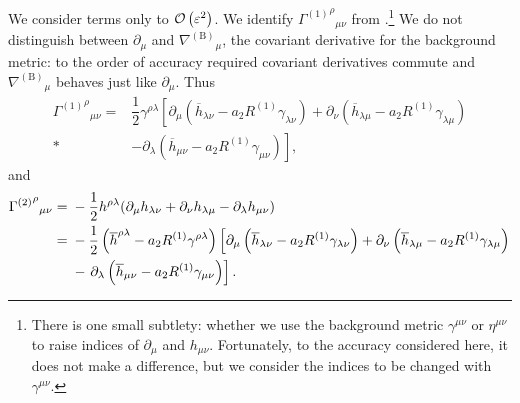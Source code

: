We consider terms only to $\mathcal{O}\left({\varepsilon^2}\right)$. We identify ${{\Gamma^{(1)}}^\rho}_{\mu\nu}$ from .\footnote{There is one small subtlety: whether we use the background metric $\gamma^{\mu\nu}$ or $\eta^{\mu\nu}$ to raise indices of $\partial_\mu$ and $h_{\mu\nu}$. Fortunately, to the accuracy considered here, it does not make a difference, but we consider the indices to be changed with $\gamma^{\mu\nu}$.} We do not distinguish between $\partial_\mu$ and ${\nabla^{(\text{B})}}_\mu$, the covariant derivative for the background metric: to the order of accuracy required covariant derivatives commute and ${\nabla^{(\text{B})}}_\mu$ behaves just like $\partial_\mu$. Thus
\begin{align}
{{\Gamma^{(1)}}^\rho}_{\mu\nu} = {} & \dfrac{1}{2}\gamma^{\rho\lambda}\left[\partial_\mu \left(\overline{h}_{\lambda\nu} - a_2 R^{(1)}\gamma_{\lambda\nu}\right) + \partial_\nu \left(\overline{h}_{\lambda\mu} - a_2 R^{(1)}\gamma_{\lambda\mu}\right) \right. \nonumber \\*
 & - \left. \partial_\lambda \left(\overline{h}_{\mu\nu} - a_2 R^{(1)}\gamma_{\mu\nu}\right)\right] ,
\end{align}
and
\begin{align}
{{\Gamma^{(2)}}^\rho}_{\mu\nu} = {} & -\dfrac{1}{2}h^{\rho\lambda}(\partial_\mu h_{\lambda\nu} + \partial_\nu h_{\lambda\mu} - \partial_\lambda h_{\mu\nu}) \nonumber \\*
 = {} & -\dfrac{1}{2}\left(\overline{h}^{\rho\lambda} - a_2 R^{(1)}\gamma^{\rho\lambda}\right)\left[\partial_\mu \left(\overline{h}_{\lambda\nu} - a_2 R^{(1)}\gamma_{\lambda\nu}\right) + \partial_\nu \left(\overline{h}_{\lambda\mu} - a_2 R^{(1)}\gamma_{\lambda\mu}\right) \right. \nonumber \\*
 & - \left. \partial_\lambda \left(\overline{h}_{\mu\nu} \vphantom{R^{(1)}} - a_2 R^{(1)}\gamma_{\mu\nu}\right)\right].
\end{align}

